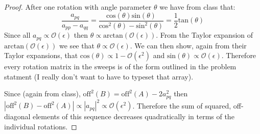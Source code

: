 \documentclass[10pt,a4paper]{article}
\begin{document}
\begin{proof}
After one rotation with angle parameter $\theta$ we have from class that:
\begin{equation}
  \frac{a_{pq}}{a_{pp}-a_{qq}} = \frac{\text{cos}(\theta) \text{sin}(\theta)}{\text{cos}^2(\theta) - \text{sin}^2(\theta)} = \frac{1}{2} \text{tan}(\theta)
\end{equation}
Since all $a_{pq} \propto \mathcal{O}(\epsilon)$ then $\theta \propto \text{arctan}(\mathcal{O}(\epsilon))$.  From the Taylor expansion of $\text{arctan}(\mathcal{O}(\epsilon))$ we see that $\theta \propto \mathcal{O}(\epsilon)$.  We can then show, again from their Taylor expansions, that $\text{cos}(\theta) \propto 1- \mathcal{O}(\epsilon^2)$ and $\text{sin}(\theta) \propto \mathcal{O}(\epsilon)$.  Therefore every rotation matrix in the sweeps is of the form outlined in the problem statment (I really don't want to have to typeset that array).

Since (again from class), $\text{off}^2(B) = \text{off}^2(A) - 2 a_{pq}^2$ then $|\text{off}^2(B) - \text{off}^2(A)| \propto |a_{pq}|^2 \propto \mathcal{O}(\epsilon^2)$.  Therefore the sum of squared, off-diagonal elements of this sequence decreases quadratically in terms of the individual rotations.
\end{proof}
\end{document}
